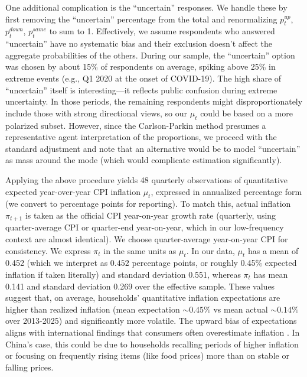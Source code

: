 \documentclass[12pt]{article}
\begin{document}
One additional complication is the “uncertain” responses. We handle these by first removing the “uncertain” percentage from the total and renormalizing $p^{up}_t$, $p^{down}_t$, $p^{same}_t$ to sum to 1. Effectively, we assume respondents who answered “uncertain” have no systematic bias and their exclusion doesn't affect the aggregate probabilities of the others. During our sample, the “uncertain” option was chosen by about 15\% of respondents on average, spiking above 25\% in extreme events (e.g., Q1 2020 at the onset of COVID-19). The high share of “uncertain” itself is interesting—it reflects public confusion during extreme uncertainty. In those periods, the remaining respondents might disproportionately include those with strong directional views, so our $\mu_t$ could be based on a more polarized subset. However, since the Carlson-Parkin method presumes a representative agent interpretation of the proportions, we proceed with the standard adjustment and note that an alternative would be to model “uncertain” as mass around the mode (which would complicate estimation significantly).

Applying the above procedure yields 48 quarterly observations of quantitative expected year-over-year CPI inflation $\mu_t$, expressed in annualized percentage form (we convert to percentage points for reporting). To match this, actual inflation $\pi_{t+1}$ is taken as the official CPI year-on-year growth rate (quarterly, using quarter-average CPI or quarter-end year-on-year, which in our low-frequency context are almost identical). We choose quarter-average year-on-year CPI for consistency. We express $\pi_t$ in the same units as $\mu_t$. In our data, $\mu_t$ has a mean of 0.452 (which we interpret as $0.452$ percentage points, or roughly 0.45\% expected inflation if taken literally) and standard deviation 0.551, whereas $\pi_t$ has mean 0.141 and standard deviation 0.269 over the effective sample. These values suggest that, on average, households' quantitative inflation expectations are higher than realized inflation (mean expectation $\sim0.45\%$ vs mean actual $\sim0.14\%$ over 2013-2025) and significantly more volatile. The upward bias of expectations aligns with international findings that consumers often overestimate inflation \cite{BruineDeBruin2010}. In China's case, this could be due to households recalling periods of higher inflation or focusing on frequently rising items (like food prices) more than on stable or falling prices.
\end{document}
